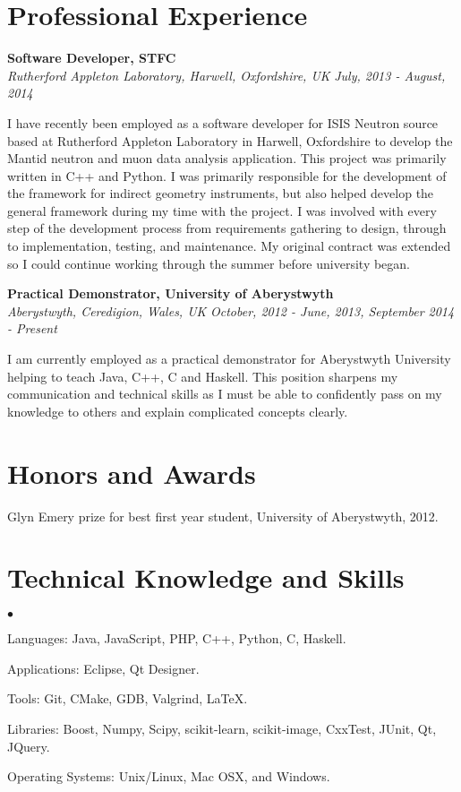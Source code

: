 \documentclass[margin,line]{res}
\newenvironment{list2}{
  \begin{list}{$\bullet$}{%
      \setlength{\itemsep}{0in}
      \setlength{\parsep}{0in} \setlength{\parskip}{0in}
      \setlength{\topsep}{0in} \setlength{\partopsep}{0in}
      \setlength{\leftmargin}{0.2in}}}{\end{list}}
\begin{document}
\begin{resume}
\section{\sc Professional Experience}
{\bf Software Developer, STFC} \\
{\it Rutherford Appleton Laboratory, Harwell, Oxfordshire, UK}  \hfill {\it July, 2013 - August, 2014}

I have recently been employed as a software developer for ISIS Neutron source based at Rutherford Appleton Laboratory in Harwell, Oxfordshire to develop the Mantid neutron and muon data analysis application. This project was primarily written in C++ and Python. I was primarily responsible for the development of the framework for indirect geometry instruments, but also helped develop the general framework during my time with the project. I was involved with every step of the development process from requirements gathering to design, through to implementation, testing, and maintenance. My original contract was extended so I could continue working through the summer before university began.

{\bf Practical Demonstrator, University of Aberystwyth} \\
{\it Aberystwyth, Ceredigion, Wales, UK} \hfill {\it  October, 2012 - June, 2013, September 2014 - Present}

I am currently employed as a practical demonstrator for Aberystwyth University helping to teach Java, C++, C and Haskell. This position sharpens my communication and technical skills as I must be able to confidently pass on my knowledge to others and explain complicated concepts clearly.

\section{\sc Honors and Awards}
Glyn Emery prize for best first year student, University of Aberystwyth, 2012.

\section{\sc Technical Knowledge and  Skills}
\begin{list2}
\item Languages: Java, JavaScript, PHP, C++, Python, C, Haskell.
\item Applications: Eclipse, Qt Designer.
\item Tools: Git, CMake, GDB, Valgrind, \LaTeX.
\item Libraries: Boost, Numpy, Scipy, scikit-learn, scikit-image, CxxTest, JUnit, Qt, JQuery.
\item Operating Systems:  Unix/Linux, Mac OSX, and Windows.\\
\end{list2}


\end{resume}
\end{document}
